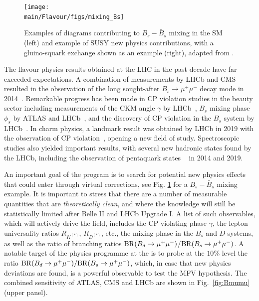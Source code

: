 \begin{figure}[t]
  \centering  
  \texttt{[image: \\main/Flavour/figs/mixing\_Bs]}~~~~
  \caption{Examples of diagrams contributing to $B_s-\bar B_s$ mixing in the SM (left) and example of SUSY new physics contributions, with a gluino-squark exchange shown as an example (right), adapted from \cite{Zupan:2019uoi}.}
  \label{fig:Bsmixing}
\end{figure}

The flavour physics results obtained at the LHC in the past decade have far exceeded expectations. 
A combination of measurements by LHCb and CMS resulted in the observation of the long sought-after $B_s\rightarrow \mu^+\mu^-$ decay mode in 2014~\cite{CMS:2014xfa}.
Remarkable progress has been made in CP violation studies in the beauty sector including  measurements of the CKM angle $\gamma$ by LHCb~\cite{Aaij:2018uns}, 
$B_s$ mixing phase $\phi_s$ by ATLAS and LHCb~\cite{ATLAS:2019akj,Govorkova:2019jlz}, and the discovery of CP violation in the $B_s$ system by LHCb~\cite{Aaij:2013iua}.
In charm physics, a landmark result was obtained by LHCb in 2019 with the observation of CP 
violation~\cite{Aaij:2019kcg}, opening a new field of study. Spectroscopic studies also yielded important results, with several new hadronic states found by the LHCb, including the observation of pentaquark states ~\cite{Aaij:2015tga,Aaij:2019vzc} in 2014 and 2019.

An important goal of the program is to search for potential new physics effects that could enter through virtual corrections, see Fig. \ref{fig:Bsmixing} for a $B_s-\bar B_s$ mixing example. It is important to stress that there are a number of measurable quantities that are {\it theoretically clean}, and where the knowledge will still be statistically limited after Belle II and LHCb Upgrade I. A list of such observables, which will actively drive the field, includes the CP-violating phase $\gamma$, the lepton-universality ratios $R_{K^{(*)}}$, $R_{D^{(*)}}$,  etc., the mixing phase in the $B_s$ and $D$ systems, as well as the ratio of branching ratios ${\rm{BR}} (B_d \rightarrow \mu^+ \mu^-)$/${\rm{BR}} (B_s \rightarrow \mu^+ \mu^-)$. 
A notable target of the physics programme at the \HLLHC is to probe at the $10\%$ level the ratio ${\rm{BR}}(B_d \to \mu^+\mu^-)/ {\rm{BR}}(B_s \to \mu^+\mu^-)$, which, in case that new physics deviations are found, is a powerful observable to test the MFV hypothesis. The combined sensitivity of ATLAS, CMS and LHCb are shown in  Fig.~\ref{fig:Bmumu} (upper panel).  

